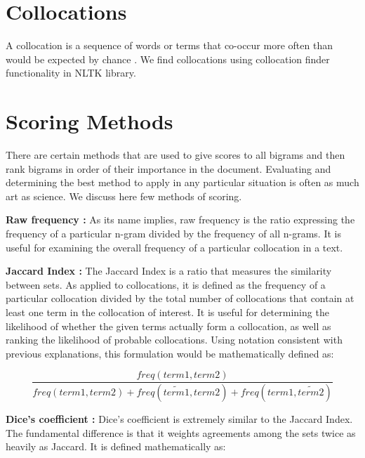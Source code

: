\documentclass{mnnit}
\begin{document}
\section{Collocations}
A collocation is a sequence of words or terms that co-occur more often than would be expected by chance . We find collocations using collocation finder functionality in NLTK library\cite{boole}.




\section{Scoring Methods}

There are certain methods that are used to give scores to all bigrams and then rank bigrams in order of their importance in the document.
Evaluating and determining the best method to apply in any particular situation is often as much art as science. We discuss here few methods of scoring\cite{nltk1}\cite{nltk2}\cite{nltk3}.

\vspace{1.5 mm}

\noindent \textbf{Raw frequency :}
As its name implies, raw frequency is the ratio expressing the frequency of a particular n-gram divided by the frequency of all n-grams. It is useful for examining the overall frequency of a particular collocation in a text.

\vspace{1.5 mm}


\noindent \textbf{Jaccard Index :}
The Jaccard Index is a ratio that measures the similarity between sets. As applied to collocations, it is defined as the frequency of a particular collocation divided by the total number of collocations that contain at least one term in the collocation of interest. It is useful for determining the likelihood of whether the given terms actually form a collocation, as well as ranking the likelihood of probable collocations. Using notation consistent with previous explanations, this formulation would be mathematically defined as:


                  \[ \frac{freq(term1, term2)}{freq(term1, term2) + freq(\widetilde{term1}, term2) + freq(term1,\widetilde{term2})}           \] 
		

        
        
        
\vspace{1.5 mm}

\noindent \textbf{Dice’s coefficient :}
Dice’s coefficient is extremely similar to the Jaccard Index. The fundamental difference is that it weights agreements among the sets twice as heavily as Jaccard. It is defined mathematically as:
\end{document}
